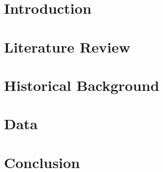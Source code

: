 
\section*{Introduction}



\newpage
\section{Literature Review}


\newpage
\section{Historical Background}



\newpage
\section{Data}


\newpage



%

\newpage

\section*{Conclusion}



